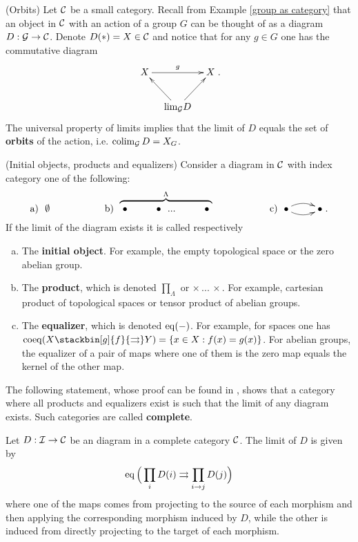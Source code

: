 \documentclass[thesis.tex]{subfiles}
\begin{document}
\begin{example}(Orbits) \label{orbits}
Let $\operatorname{\mathcal{C}}$ be a small category. Recall from Example \ref{group as category} that an object in $\operatorname{\mathcal{C}}$ with an action of a group $G$ can be thought of as a diagram $D:\operatorname{\mathcal{G}}\to\operatorname{\mathcal{C}}$. Denote $D(\ast)=X\in\operatorname{\mathcal{C}}$ and notice that for any $g\in G$ one has the commutative diagram $$\xymatrix@C=.8pc @R=1.8pc{X\ar[rr]^{g}& & X \\  &\ar[lu]\ar[ru]\lim_{\G} D & }.$$
The universal property of limits implies that the limit of $D$ equals the set of \textbf{orbits} of the action, i.e. $\operatorname*{colim}_{\operatorname{\mathcal{G}}}D=X_G$.
\end{example}

\begin{example}(Initial objects, products and equalizers) \label{products and equalizers}
Consider a diagram in $\operatorname{\mathcal{C}}$ with index category one of the following:
$$\text{a)} \ \ \emptyset \hspace*{2cm} \text{b)}\ \stackrel{\Lambda}{\overbrace{\xymatrix{\bullet &\bullet \ \ ... &\bullet}}} \hspace*{2cm} \text{c)}\ \xymatrix{\bullet\ar@/^/[r]\ar@/_/[r] & \bullet}.$$
If the limit of the diagram exists it is called respectively
\begin{enumerate}[a)]
\item The \textbf{initial object}. For example, the empty topological space or the zero abelian group.
\item The \textbf{product}, which is denoted $\prod_\Lambda$ or $\times\, ...\,\times$. For example, cartesian product of topological spaces or tensor product of abelian groups.
\item The \textbf{equalizer}, which is denoted $\operatorname{eq}(-)$. For example, for spaces one has $\coeq(X\stackbin[g]{f}{\rightrightarrows}Y)=\{x\in X:f(x)=g(x)\}$. For abelian groups, the equalizer of a pair of maps where one of them is the zero map equals the kernel of the other map.
\end{enumerate}
\end{example}

The following statement, whose proof can be found in \cite[p.112]{MaL98}, shows that a category where all products and equalizers exist is such that the limit of any diagram exists. Such categories are called \textbf{complete}.

\begin{lemma}\label{formula for lim}
Let $D:\operatorname{\mathcal{I}}\to\operatorname{\mathcal{C}}$ be an diagram in a complete category $\operatorname{\mathcal{C}}$. The limit of $D$ is given by $$\operatorname{eq}\Big(\prod_{i}D(i)\rightrightarrows\prod_{i\to j}D(j)\Big)$$
where one of the maps comes from projecting to the source of each morphism and then applying the corresponding morphism induced by $D$, while the other is induced from directly projecting to the target of each morphism.
\end{lemma}
\end{document}
